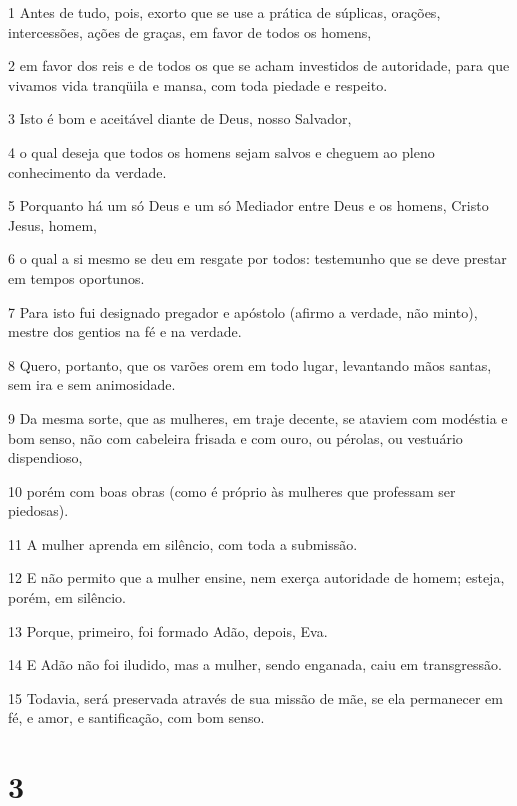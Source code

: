 \par 1 Antes de tudo, pois, exorto que se use a prática de súplicas, orações, intercessões, ações de graças, em favor de todos os homens,
\par 2 em favor dos reis e de todos os que se acham investidos de autoridade, para que vivamos vida tranqüila e mansa, com toda piedade e respeito.
\par 3 Isto é bom e aceitável diante de Deus, nosso Salvador,
\par 4 o qual deseja que todos os homens sejam salvos e cheguem ao pleno conhecimento da verdade.
\par 5 Porquanto há um só Deus e um só Mediador entre Deus e os homens, Cristo Jesus, homem,
\par 6 o qual a si mesmo se deu em resgate por todos: testemunho que se deve prestar em tempos oportunos.
\par 7 Para isto fui designado pregador e apóstolo (afirmo a verdade, não minto), mestre dos gentios na fé e na verdade.
\par 8 Quero, portanto, que os varões orem em todo lugar, levantando mãos santas, sem ira e sem animosidade.
\par 9 Da mesma sorte, que as mulheres, em traje decente, se ataviem com modéstia e bom senso, não com cabeleira frisada e com ouro, ou pérolas, ou vestuário dispendioso,
\par 10 porém com boas obras (como é próprio às mulheres que professam ser piedosas).
\par 11 A mulher aprenda em silêncio, com toda a submissão.
\par 12 E não permito que a mulher ensine, nem exerça autoridade de homem; esteja, porém, em silêncio.
\par 13 Porque, primeiro, foi formado Adão, depois, Eva.
\par 14 E Adão não foi iludido, mas a mulher, sendo enganada, caiu em transgressão.
\par 15 Todavia, será preservada através de sua missão de mãe, se ela permanecer em fé, e amor, e santificação, com bom senso.

\chapter{3}

